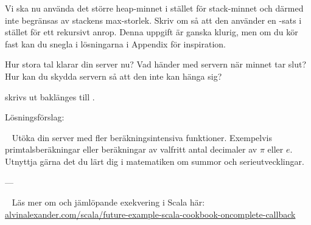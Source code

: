 \Subtask Vi ska nu använda det större heap-minnet i stället för stack-minnet och därmed inte begränsas av stackens max-storlek. Skriv om  så att den använder en -sats i stället för ett rekursivt anrop. Denna uppgift är ganska klurig, men om du kör fast kan du snegla i lösningarna i Appendix för inspiration.

Hur stora tal klarar din server nu? Vad händer med servern när minnet tar slut? Hur kan du skydda servern så att den inte kan hänga sig?

\SOLUTION


\TaskSolved \what

\SubtaskSolved  {} skrivs ut baklänges till .

\SubtaskSolved

\SubtaskSolved

\SubtaskSolved

\SubtaskSolved

\SubtaskSolved

\SubtaskSolved

\SubtaskSolved

\SubtaskSolved

Lösningsförslag:


\QUESTEND






\WHAT{}

\QUESTBEGIN

\Task  \what~ Utöka din server med fler beräkningsintensiva funktioner. Exempelvis primtalsberäkningar eller beräkningar av valfritt antal decimaler av $\pi$ eller $e$. Utnyttja gärna det du lärt dig i  matematiken om summor och serieutvecklingar.

\SOLUTION


\TaskSolved \what

---


\QUESTEND






\WHAT{}

\QUESTBEGIN

\Task  \what~ Läs mer om  och jämlöpande exekvering i Scala här:\\
\href{http://alvinalexander.com/scala/future-example-scala-cookbook-oncomplete-callback}{alvinalexander.com/scala/future-example-scala-cookbook-oncomplete-callback}

